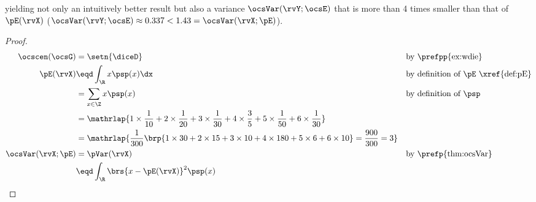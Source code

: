 \begin{tabstr}{0.75}
\begin{example}
yielding not only an intuitively better result but also a variance $\ocsVar(\rvY;\ocsE)$ 
that is more than 4 times smaller than that of $\pE(\rvX)$
($\ocsVar(\rvY;\ocsE)\approx0.337<1.43=\ocsVar(\rvX;\pE)$).
\end{example}
\begin{proof}
    \begin{align*}
      \ocscen(\ocsG)
        &= \setn{\diceD}
        &&\text{by \prefpp{ex:wdie}}
      \\
      \pE(\rvX) 
        &\eqd \int_{\R} x\psp(x)\dx
        && \text{by definition of $\pE$ \xref{def:pE}}
      \\&= \sum_{x\in\Z} x\psp(x)
        && \text{by definition of $\psp$}
      \\&= \mathrlap{1\times\frac{1}{10}+2\times\frac{1}{20}+3\times\frac{1}{30}+4\times\frac{3}{5}+5\times\frac{1}{50}+6\times\frac{1}{30}}
      \\&=\mathrlap{\frac{1}{300}\brp{1\times30 + 2\times15 + 3\times10 + 4\times180 + 5\times6 + 6\times10}
         = \frac{900}{300} = 3}
      \\
      \ocsVar(\rvX;\pE)
        &= \pVar(\rvX)
        && \text{by \prefp{thm:ocsVar}}
      \\&\eqd \int_{\R} \brs{x-\pE(\rvX)}^2\psp(x)

\end{align*}
\end{proof}
\end{tabstr}
